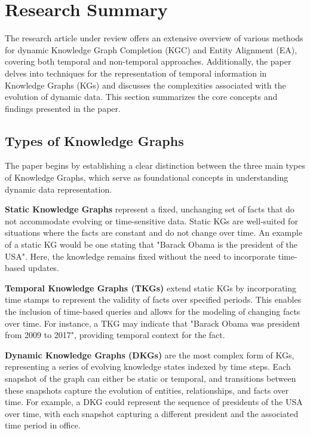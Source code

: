 \section{Research Summary}

The research article under review offers an extensive overview of various methods for dynamic Knowledge Graph Completion (KGC) and Entity Alignment (EA), covering both temporal and non-temporal approaches. Additionally, the paper delves into techniques for the representation of temporal information in Knowledge Graphs (KGs) and discusses the complexities associated with the evolution of dynamic data. This section summarizes the core concepts and findings presented in the paper.

\subsection{Types of Knowledge Graphs}

The paper begins by establishing a clear distinction between the three main types of Knowledge Graphs, which serve as foundational concepts in understanding dynamic data 
representation.

\textbf{Static Knowledge Graphs} represent a fixed, unchanging set of facts that do not accommodate evolving or time-sensitive data. Static KGs are well-suited for situations where 
the facts are constant and do not change over time. An example of a static KG would be one stating that "Barack Obama is the president of the USA". Here, the knowledge remains fixed 
without the need to incorporate time-based updates.

\textbf{Temporal Knowledge Graphs (TKGs)} extend static KGs by incorporating time stamps to represent the validity of facts over specified periods. This enables the inclusion of 
time-based queries and allows for the modeling of changing facts over time. For instance, a TKG may indicate that "Barack Obama was president from 2009 to 2017", providing temporal 
context for the fact.

\textbf{Dynamic Knowledge Graphs (DKGs)} are the most complex form of KGs, representing a series of evolving knowledge states indexed by time steps. Each snapshot of the graph can 
either be static or temporal, and transitions between these snapshots capture the evolution of entities, relationships, and facts over time. For example, a DKG could represent the 
sequence of presidents of the USA over time, with each snapshot capturing a different president and the associated time period in office.

